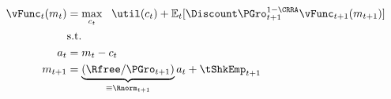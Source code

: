   \begin{equation}\begin{gathered}\begin{aligned}
    \null{\vFunc}_{t}({m}_{t})  & = \max_{{c}_{t}} ~~ \util({c}_{t})+
                                     \Ex_{t}[{\Discount} \PGro_{t+1}^{1-\CRRA}\null{\vFunc}_{t+1}({m}_{t+1})] \label{vtNorm}
    \\         & \text{s.t.} &   \nonumber \\
    {a}_{t}    & = {m}_{t}-{c}_{t} \nonumber
    \\      {m}_{t+1}  & = \underbrace{\left(\Rfree/\PGro_{t+1}\right)}_{\equiv \Rnorm_{t+1}}{a}_{t}+\tShkEmp_{t+1} \nonumber
  \end{aligned}\end{gathered}\end{equation}
